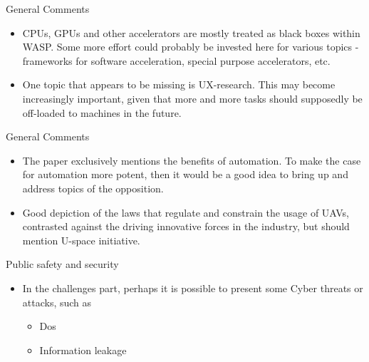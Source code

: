 \documentclass{beamer}
\begin{document}
\begin{frame}{General Comments}

  \begin{itemize}

  \item CPUs, GPUs and other accelerators are mostly treated as black boxes
    within WASP. Some more effort could probably be invested here for various
    topics - frameworks for software acceleration, special purpose accelerators,
    etc.

  \item One topic that appears to be missing is UX-research. This may become
    increasingly important, given that more and more tasks should supposedly be
    off-loaded to machines in the future.

  \end{itemize}

\end{frame}


\begin{frame}{General Comments}

  \begin{itemize}
  \item The paper exclusively mentions the benefits of automation. To make the
    case for automation more potent, then it would be a good idea to bring up
    and address topics of the opposition.

  \item Good depiction of the laws that regulate and constrain the usage of
    UAVs, contrasted against the driving innovative forces in the industry, but
    should mention U-space initiative.

  \end{itemize}

\end{frame}


\begin{frame}{Public safety and security}
  \begin{itemize}
  \item In the challenges part, perhaps it is possible to present some Cyber
    threats or attacks, such as
    \begin{itemize}
    \item Dos
    \item Information leakage
    \end{itemize}
  \end{itemize}
\end{frame}
\end{document}
